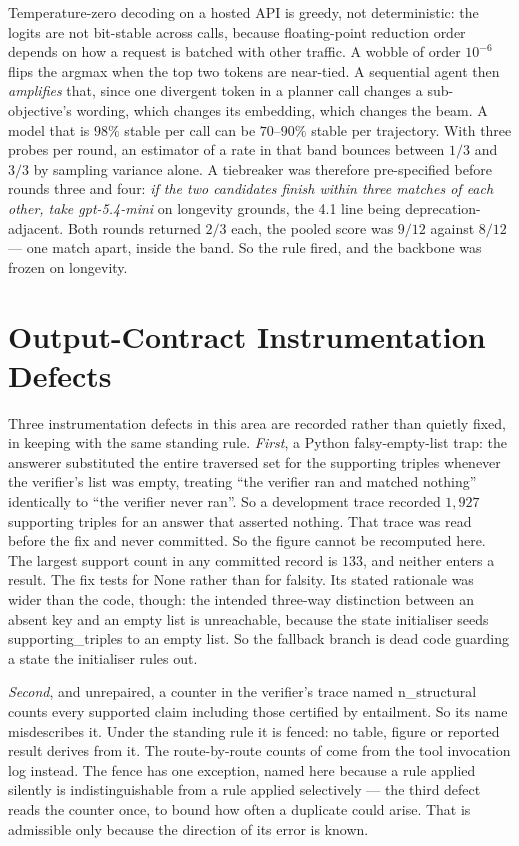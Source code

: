 Temperature-zero decoding on a hosted API is greedy, not deterministic: the
logits are not bit-stable across calls, because floating-point reduction order
depends on how a request is batched with other traffic. A wobble of order
$10^{-6}$ flips the argmax when the top two tokens are near-tied. A sequential
agent then \emph{amplifies} that, since one divergent token in a planner call
changes a sub-objective's wording, which changes its embedding, which changes
the beam. A model that is $98\%$ stable per call can be $70$--$90\%$ stable per
trajectory. With three probes per round, an estimator of a rate in that band
bounces between $1/3$ and $3/3$ by sampling variance alone. A tiebreaker was
therefore pre-specified before rounds three and four: \emph{if the two
candidates finish within three matches of each other, take
\textsf{gpt-5.4-mini}} on longevity grounds, the 4.1 line being
deprecation-adjacent. Both rounds returned $2/3$ each, the pooled score was
$9/12$ against $8/12$ --- one match apart, inside the band. So the rule fired,
and the backbone was frozen on longevity.


\section{Output-Contract Instrumentation Defects}\label{app:contract-defects}

Three instrumentation defects in this area are recorded rather than quietly
fixed, in keeping with the same standing rule. \emph{First}, a Python
falsy-empty-list trap: the answerer substituted the entire traversed set for the
supporting triples whenever the verifier's list was empty, treating ``the
verifier ran and matched nothing'' identically to ``the verifier never ran''. So
a development trace recorded $1{,}927$ supporting triples for an answer that
asserted nothing. That trace was read before the fix and never committed. So the
figure cannot be recomputed here. The largest support count in any committed
record is $133$, and neither enters a result. The fix tests for \textsf{None}
rather than for falsity. Its stated rationale was wider than the code, though:
the intended three-way distinction between an absent key and an empty list is
unreachable, because the state initialiser seeds \textsf{supporting\_triples} to
an empty list. So the fallback branch is dead code guarding a state the
initialiser rules out.

\emph{Second}, and unrepaired, a counter in the verifier's trace named
\textsf{n\_structural} counts every supported claim including those certified by
entailment. So its name misdescribes it. Under the standing rule it is fenced:
no table, figure or reported result derives from it. The route-by-route
counts of  come from the tool invocation log instead.
The fence has one exception, named here because a rule applied silently is
indistinguishable from a rule applied selectively --- the third defect reads the
counter once, to bound how often a duplicate could arise. That is admissible
only because the direction of its error is known.

